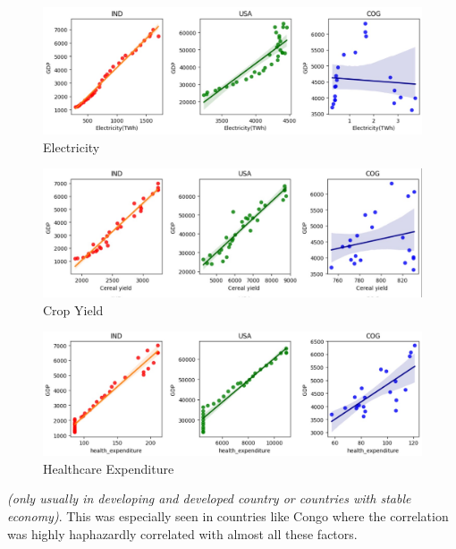 \documentclass[conference]{IEEEtran}
\begin{document}
\begin{figure}[htbp]
    \centerline{\includegraphics[scale=0.35]{eda2.jpg}}
    \caption{Electricity}
\end{figure}
\begin{figure}[htbp]
    \centerline{\includegraphics[scale=0.35]{eda3.jpg}}
    \caption{Crop Yield}
\end{figure}
\begin{figure}[htbp]
    \centerline{\includegraphics[scale=0.35]{eda4.jpg}}
    \caption{Healthcare Expenditure}
\end{figure}
\emph{(only usually in developing and developed country or countries with stable economy)}. This was especially seen in countries like Congo where the correlation was highly haphazardly correlated with almost all these factors.
\bigskip
\end{document}
